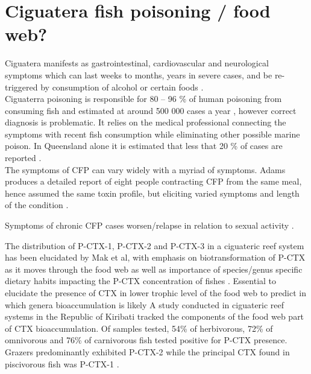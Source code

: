 \documentclass[12pt]{article}
\begin{document}
\section{Ciguatera fish poisoning /  food web?}

Ciguatera manifests as gastrointestinal, cardiovascular and neurological symptoms which can last weeks to months, years in severe cases, and be re-triggered by consumption of alcohol or certain foods \cite{lewis2006ciguatera}. 
\\

Ciguaterra poisoning is responsible for 80 – 96 \% of human poisoning from consuming fish and estimated at around 500 000 cases a year \cite{grandjean2008centers}, however correct diagnosis is problematic. It relies on the medical professional connecting the symptoms with recent fish consumption while eliminating other possible marine poison. In Queensland alone it is estimated that less that 20 \% of cases are reported \cite{lewis2006ciguatera}.\\

The symptoms of CFP can vary widely with a myriad of symptoms. Adams produces a detailed report of eight people contracting CFP from the same meal, hence assumed the same toxin profile, but eliciting varied symptoms and length of the condition \cite{adams1993outbreak}.

Symptoms of chronic CFP cases worsen/relapse in relation to sexual activity \cite{lange1992travel}.

The distribution of P-CTX-1, P-CTX-2 and P-CTX-3 in a ciguateric reef system has been elucidated by Mak et al, with emphasis on biotransformation of P-CTX as it moves through the food web as well as importance of species/genus specific dietary habits impacting the P-CTX concentration of fishes \cite{mak2013pacific}.
Essential to elucidate the presence of CTX in lower trophic level of the food web to predict in which genera bioaccumulation is likely \cite{mak2013pacific}
A study conducted in ciguateric reef systems in the Republic of Kiribati tracked the components of the food web part of CTX bioaccumulation. Of samples tested, 54\% of herbivorous, 72\% of omnivorous and 76\% of carnivorous fish tested positive for P-CTX presence. Grazers predominantly exhibited P-CTX-2 while the principal CTX found in piscivorous fish was P-CTX-1 \cite{mak2013pacific}.
\end{document}
